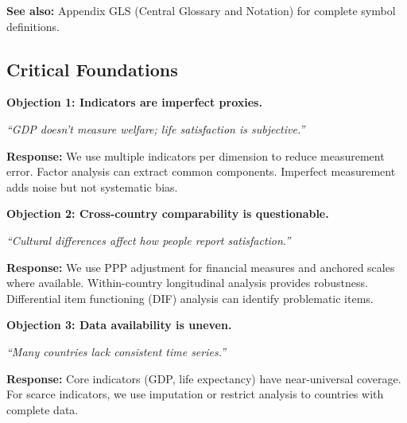 \textbf{See also:} Appendix GLS (Central Glossary and Notation) for complete symbol definitions.


\subsection{Critical Foundations}
\label{sec:E-foundations}

\begin{tcolorbox}[colback=red!5!white, colframe=red!75!black,
    title=\textbf{Critical Foundations: Objections and Responses}]

\textbf{Objection 1: Indicators are imperfect proxies.}

\textit{``GDP doesn't measure welfare; life satisfaction is subjective.''}

\textbf{Response:} We use multiple indicators per dimension to reduce
measurement error. Factor analysis can extract common components.
Imperfect measurement adds noise but not systematic bias.

\medskip

\textbf{Objection 2: Cross-country comparability is questionable.}

\textit{``Cultural differences affect how people report satisfaction.''}

\textbf{Response:} We use PPP adjustment for financial measures and
anchored scales where available. Within-country longitudinal analysis
provides robustness. Differential item functioning (DIF) analysis
can identify problematic items.

\medskip

\textbf{Objection 3: Data availability is uneven.}

\textit{``Many countries lack consistent time series.''}

\textbf{Response:} Core indicators (GDP, life expectancy) have near-universal
coverage. For scarce indicators, we use imputation or restrict analysis
to countries with complete data.

\end{tcolorbox}



